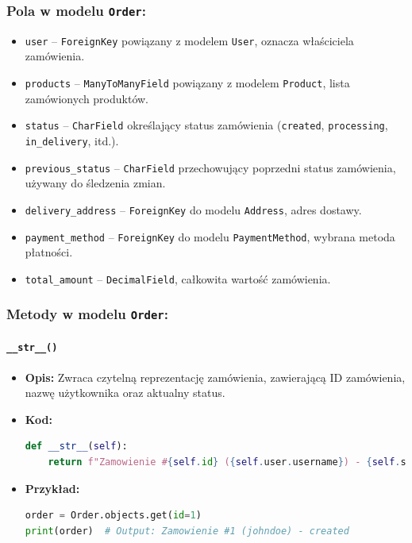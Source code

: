 \documentclass[12pt,a4paper,oneside]{article}
\theoremstyle{definition}
\numberwithin{equation}{section}
\begin{document}
\subsubsection{Pola w modelu \texttt{Order}:}
\begin{itemize}
    \item \texttt{user} – \texttt{ForeignKey} powiązany z modelem \texttt{User}, oznacza właściciela zamówienia.
    \item \texttt{products} – \texttt{ManyToManyField} powiązany z modelem \texttt{Product}, lista zamówionych produktów.
    \item \texttt{status} – \texttt{CharField} określający status zamówienia (\texttt{created}, \texttt{processing}, \texttt{in\_delivery}, itd.).
    \item \texttt{previous\_status} – \texttt{CharField} przechowujący poprzedni status zamówienia, używany do śledzenia zmian.
    \item \texttt{delivery\_address} – \texttt{ForeignKey} do modelu \texttt{Address}, adres dostawy.
    \item \texttt{payment\_method} – \texttt{ForeignKey} do modelu \texttt{PaymentMethod}, wybrana metoda płatności.
    \item \texttt{total\_amount} – \texttt{DecimalField}, całkowita wartość zamówienia.
\end{itemize}

\subsubsection{Metody w modelu \texttt{Order}:}

\paragraph{\texttt{\_\_str\_\_()}}
\begin{itemize}
    \item \textbf{Opis:} Zwraca czytelną reprezentację zamówienia, zawierającą ID zamówienia, nazwę użytkownika oraz aktualny status.
    \item \textbf{Kod:}
\begin{lstlisting}[language=Python]
def __str__(self):
    return f"Zamowienie #{self.id} ({self.user.username}) - {self.status}"
\end{lstlisting}
    \item \textbf{Przykład:}
\begin{lstlisting}[language=Python]
order = Order.objects.get(id=1)
print(order)  # Output: Zamowienie #1 (johndoe) - created
\end{lstlisting}
\end{itemize}
\end{document}
